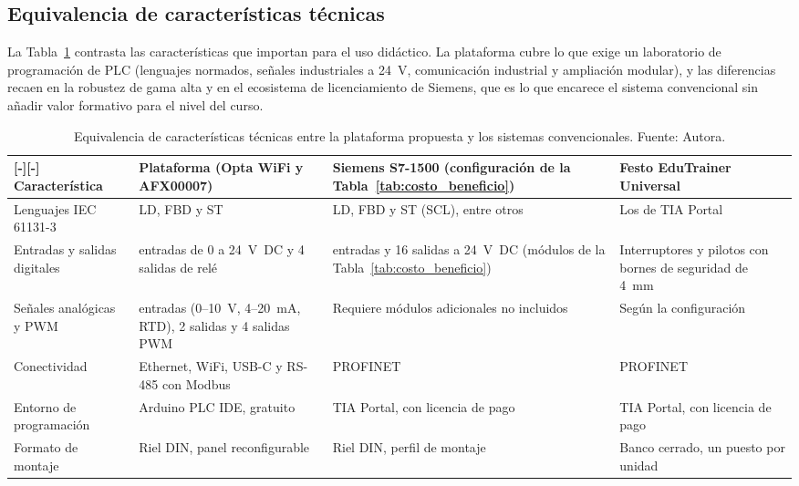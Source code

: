 \documentclass[12pt,a4paper,oneside]{report}
\newcommand{\filacolor}[1]{\rowcolor{#1}[\dimexpr\tabcolsep-\arrayrulewidth\relax][\dimexpr\tabcolsep-\arrayrulewidth\relax]}
\begin{document}
\subsection{Equivalencia de características técnicas}

La Tabla~\ref{tab:equivalencia_tecnica} contrasta las características que importan para el uso didáctico. La plataforma cubre lo que exige un laboratorio de programación de PLC (lenguajes normados, señales industriales a 24~V, comunicación industrial y ampliación modular), y las diferencias recaen en la robustez de gama alta y en el ecosistema de licenciamiento de Siemens, que es lo que encarece el sistema convencional sin añadir valor formativo para el nivel del curso.

\begin{table}[H]
\centering
\caption{Equivalencia de características técnicas entre la plataforma propuesta y los sistemas convencionales. Fuente: Autora.}
\label{tab:equivalencia_tecnica}
\footnotesize
\renewcommand{\arraystretch}{1.3}
\renewcommand\tabularxcolumn[1]{m{#1}}
\begin{tabularx}{\textwidth}{|>{\raggedright\arraybackslash}m{2.8cm}|>{\raggedright\arraybackslash}X|>{\raggedright\arraybackslash}X|>{\raggedright\arraybackslash}X|}
\hline
\filacolor{TableGray}
\textbf{Característica} & \textbf{Plataforma (Opta WiFi y AFX00007)} & \textbf{Siemens S7-1500 (configuración de la Tabla~\ref{tab:costo_beneficio})} & \textbf{Festo EduTrainer Universal} \\
\hline
Lenguajes IEC 61131-3 & LD, FBD y ST~\cite{ref1,ref8} & LD, FBD y ST (SCL), entre otros & Los de TIA Portal \\
\hline
Entradas y salidas digitales & 8 entradas de 0 a 24~V~DC y 4 salidas de relé~\cite{ref8} & 16 entradas y 16 salidas a 24~V~DC (módulos de la Tabla~\ref{tab:costo_beneficio}) & Interruptores y pilotos con bornes de seguridad de 4~mm~\cite{ref18} \\
\hline
Señales analógicas y PWM & 6 entradas (0--10~V, 4--20~mA, RTD), 2 salidas y 4 salidas PWM~\cite{ref35} & Requiere módulos adicionales no incluidos & Según la configuración \\
\hline
Conectividad & Ethernet, WiFi, USB-C y RS-485 con Modbus~\cite{ref8} & PROFINET & PROFINET \\
\hline
Entorno de programación & Arduino PLC IDE, gratuito & TIA Portal, con licencia de pago & TIA Portal, con licencia de pago \\
\hline
Formato de montaje & Riel DIN, panel reconfigurable & Riel DIN, perfil de montaje & Banco cerrado, un puesto por unidad~\cite{ref18} \\
\hline
\end{tabularx}
\end{table}
\end{document}
